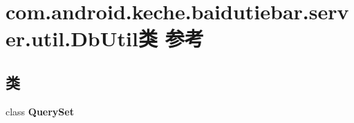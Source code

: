 \hypertarget{classcom_1_1android_1_1keche_1_1baidutiebar_1_1server_1_1util_1_1_db_util}{}\section{com.\+android.\+keche.\+baidutiebar.\+server.\+util.\+Db\+Util类 参考}
\label{classcom_1_1android_1_1keche_1_1baidutiebar_1_1server_1_1util_1_1_db_util}
\subsection*{类}
\begin{DoxyCompactItemize}
\item 
class {\bfseries Query\+Set}
\end{DoxyCompactItemize}
